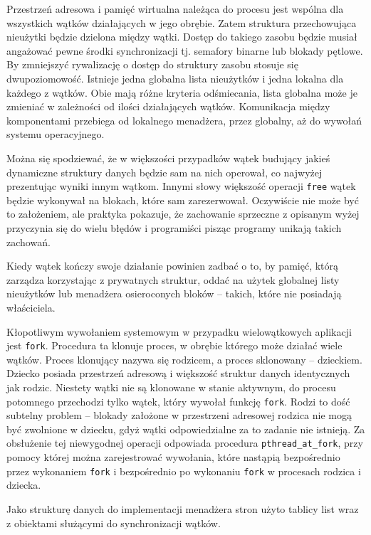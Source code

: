 \documentclass[12pt,a4paper,titlepage,twoside]{mwart}
\begin{document}
Przestrzeń adresowa i pamięć wirtualna należąca do procesu jest wspólna dla
wszystkich wątków działających w jego obrębie. Zatem struktura przechowująca
nieużytki będzie dzielona między wątki. Dostęp do takiego zasobu będzie musiał
angażować pewne środki synchronizacji tj. semafory binarne lub blokady pętlowe.
By zmniejszyć rywalizację o dostęp do struktury zasobu stosuje się
dwupoziomowość. Istnieje jedna globalna lista nieużytków i jedna lokalna dla
każdego z wątków. Obie mają różne kryteria odśmiecania, lista globalna może je
zmieniać w zależności od ilości działających wątków. Komunikacja między
komponentami przebiega od lokalnego menadżera, przez globalny, aż do wywołań
systemu operacyjnego.

Można się spodziewać, że w większości przypadków wątek budujący jakieś
dynamiczne struktury danych będzie sam na nich operował, co najwyżej
prezentując wyniki innym wątkom. Innymi słowy większość operacji \verb+free+
wątek będzie wykonywał na blokach, które sam zarezerwował. Oczywiście nie może
być to założeniem, ale praktyka pokazuje, że zachowanie sprzeczne z opisanym
wyżej przyczynia się do wielu błędów i programiści pisząc programy unikają
takich zachowań.

Kiedy wątek kończy swoje działanie powinien zadbać o to, by pamięć, którą
zarządza korzystając z prywatnych struktur, oddać na użytek globalnej listy
nieużytków lub menadżera osieroconych bloków -- takich, które nie posiadają
właściciela.

Kłopotliwym wywołaniem systemowym w przypadku wielowątkowych aplikacji jest
\texttt{fork}. Procedura ta klonuje proces, w obrębie którego może działać
wiele wątków. Proces klonujący nazywa się rodzicem, a proces sklonowany --
dzieckiem.  Dziecko posiada przestrzeń adresową i większość struktur danych
identycznych jak rodzic. Niestety wątki nie są klonowane w stanie aktywnym, do
procesu potomnego przechodzi tylko wątek, który wywołał funkcję \verb+fork+.
Rodzi to dość subtelny problem -- blokady założone w przestrzeni adresowej
rodzica nie mogą być zwolnione w dziecku, gdyż wątki odpowiedzialne za to
zadanie nie istnieją. Za obsłużenie tej niewygodnej operacji odpowiada
procedura \verb+pthread_at_fork+, przy pomocy której można zarejestrować
wywołania, które nastąpią bezpośrednio przez wykonaniem \verb+fork+ i
bezpośrednio po wykonaniu \verb+fork+ w procesach rodzica i dziecka.

Jako strukturę danych do implementacji menadżera stron użyto tablicy list wraz
z obiektami służącymi do synchronizacji wątków.
\end{document}
